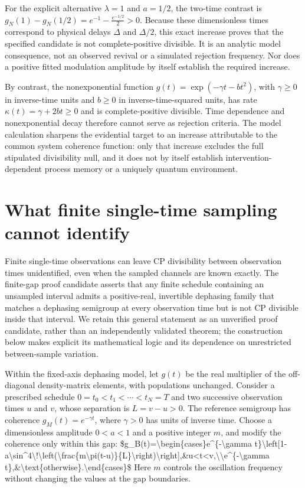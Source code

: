 \documentclass[11pt]{article}
\begin{document}
For the explicit alternative $\lambda=1$ and $a=1/2$, the two-time contrast is
$g_N(1)-g_N(1/2)=e^{-1}-\frac{e^{-1/2}}{2}>0.$
Because these dimensionless times correspond to physical delays $\Delta$ and $\Delta/2$, this exact increase proves that the specified candidate is not complete-positive divisible. It is an analytic model consequence, not an observed revival or a simulated rejection frequency. Nor does a positive fitted modulation amplitude by itself establish the required increase.

By contrast, the nonexponential function $g(t)=\exp(-\gamma t-bt^2)$, with $\gamma\geq0$ in inverse-time units and $b\geq0$ in inverse-time-squared units, has rate $\kappa(t)=\gamma+2bt\geq0$ and is complete-positive divisible. Time dependence and nonexponential decay therefore cannot serve as rejection criteria. The model calculation sharpens the evidential target to an increase attributable to the common system coherence function: only that increase excludes the full stipulated divisibility null, and it does not by itself establish intervention-dependent process memory or a uniquely quantum environment.

\section{What finite single-time sampling cannot identify}
Finite single-time observations can leave CP divisibility between observation times unidentified, even when the sampled channels are known exactly. The finite-gap proof candidate asserts that any finite schedule containing an unsampled interval admits a positive-real, invertible dephasing family that matches a dephasing semigroup at every observation time but is not CP divisible inside that interval. We retain this general statement as an unverified proof candidate, rather than an independently validated theorem; the construction below makes explicit its mathematical logic and its dependence on unrestricted between-sample variation.

Within the fixed-axis dephasing model, let $g(t)$ be the real multiplier of the off-diagonal density-matrix elements, with populations unchanged. Consider a prescribed schedule $0=t_0<t_1<\cdots<t_N=T$ and two successive observation times $u$ and $v$, whose separation is $L=v-u>0$. The reference semigroup has coherence $g_M(t)=e^{-\gamma t}$, where $\gamma>0$ has units of inverse time. Choose a dimensionless amplitude $0<a<1$ and a positive integer $m$, and modify the coherence only within this gap: \$g\_B(t)=\textbackslash{}begin\{cases\}e\textasciicircum{}\{-\textbackslash{}gamma t\}\textbackslash{}left[1-a\textbackslash{}sin\textasciicircum{}4\textbackslash{}!\textbackslash{}left(\textbackslash{}frac\{m\textbackslash{}pi(t-u)\}\{L\}\textbackslash{}right)\textbackslash{}right],\&u\textless{}t\textless{}v,\textbackslash{}\textbackslash{}e\textasciicircum{}\{-\textbackslash{}gamma t\},\&\textbackslash{}text\{otherwise\}.\textbackslash{}end\{cases\}\$ Here $m$ controls the oscillation frequency without changing the values at the gap boundaries.
\end{document}
